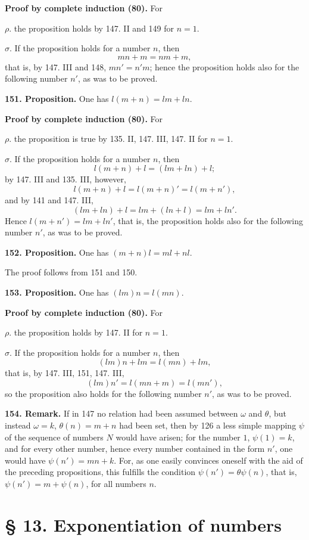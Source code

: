 \documentclass[11pt]{article}
\begin{document}
\noindent\textbf{Proof by complete induction (80).} For

\noindent $\rho.$ the proposition holds by 147. II and 149 for $n=1$.

\noindent $\sigma.$ If the proposition holds for a number $n$, then
\[
mn+m=nm+m,
\]
that is, by 147. III and 148, $mn'=n'm$; hence the proposition holds also for the following number $n'$, as was to be proved.

\noindent\textbf{151. Proposition.} One has $l(m+n)=lm+ln$.

\noindent\textbf{Proof by complete induction (80).} For

\noindent $\rho.$ the proposition is true by 135. II, 147. III, 147. II for $n=1$.

\noindent $\sigma.$ If the proposition holds for a number $n$, then
\[
l(m+n)+l=(lm+ln)+l;
\]
by 147. III and 135. III, however,
\[
l(m+n)+l=l(m+n)'=l(m+n'),
\]
and by 141 and 147. III,
\[
(lm+ln)+l=lm+(ln+l)=lm+ln'.
\]
Hence $l(m+n')=lm+ln'$, that is, the proposition holds also for the following number $n'$, as was to be proved.

\noindent\textbf{152. Proposition.} One has $(m+n)l=ml+nl$.

The proof follows from 151 and 150.

\noindent\textbf{153. Proposition.} One has $(lm)n=l(mn)$.

\noindent\textbf{Proof by complete induction (80).} For

\noindent $\rho.$ the proposition holds by 147. II for $n=1$.

\noindent $\sigma.$ If the proposition holds for a number $n$, then
\[
(lm)n+lm=l(mn)+lm,
\]
that is, by 147. III, 151, 147. III,
\[
(lm)n'=l(mn+m)=l(mn'),
\]
so the proposition also holds for the following number $n'$, as was to be proved.

\noindent\textbf{154. Remark.} If in 147 no relation had been assumed between $\omega$ and $\theta$, but instead $\omega=k$, $\theta(n)=m+n$ had been set, then by 126 a less simple mapping $\psi$ of the sequence of numbers $N$ would have arisen; for the number $1$, $\psi(1)=k$, and for every other number, hence every number contained in the form $n'$, one would have $\psi(n')=mn+k$. For, as one easily convinces oneself with the aid of the preceding propositions, this fulfills the condition $\psi(n')=\theta\psi(n)$, that is, $\psi(n')=m+\psi(n)$, for all numbers $n$.

\section*{§ 13. Exponentiation of numbers}
\end{document}
